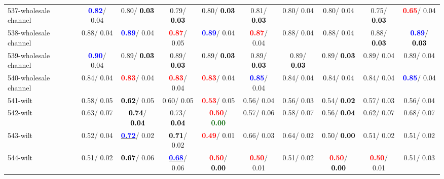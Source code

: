 \begin{table}[h]
\begin{center}
{\begin{tabular}{lc|c|c|c|c|c|c|c|c}
537-wholesale channel & \textcolor{blue}{\textbf{  0.82}}/  0.04 &   0.80/\textcolor{black}{\textbf{  0.03}} &   0.79/\textcolor{black}{\textbf{  0.03}} &   0.80/\textcolor{black}{\textbf{  0.03}} &   0.81/\textcolor{black}{\textbf{  0.03}} &   0.80/  0.04 &   0.80/  0.04 &   0.75/\textcolor{black}{\textbf{  0.03}} & \textcolor{red}{\textbf{  0.65}}/  0.04 \\
538-wholesale channel &   0.88/  0.04 & \textcolor{blue}{\textbf{  0.89}}/  0.04 & \textcolor{red}{\textbf{  0.87}}/  0.05 & \textcolor{blue}{\textbf{  0.89}}/  0.04 & \textcolor{red}{\textbf{  0.87}}/  0.04 &   0.88/  0.04 &   0.88/  0.04 &   0.88/\textcolor{black}{\textbf{  0.03}} & \textcolor{blue}{\textbf{  0.89}}/\textcolor{black}{\textbf{  0.03}} \\
539-wholesale channel & \textcolor{blue}{\textbf{  0.90}}/  0.04 &   0.89/\textcolor{black}{\textbf{  0.03}} &   0.89/\textcolor{black}{\textbf{  0.03}} &   0.89/\textcolor{black}{\textbf{  0.03}} &   0.89/\textcolor{black}{\textbf{  0.03}} &   0.89/\textcolor{black}{\textbf{  0.03}} &   0.89/\textcolor{black}{\textbf{  0.03}} &   0.89/  0.04 &   0.89/  0.04 \\
540-wholesale channel &   0.84/  0.04 & \textcolor{red}{\textbf{  0.83}}/  0.04 & \textcolor{red}{\textbf{  0.83}}/  0.04 & \textcolor{red}{\textbf{  0.83}}/  0.04 & \textcolor{blue}{\textbf{  0.85}}/  0.04 &   0.84/  0.04 &   0.84/  0.04 &   0.84/  0.04 & \textcolor{blue}{\textbf{  0.85}}/  0.04 \\ \hline
541-wilt &   0.58/  0.05 & \textcolor{black}{\textbf{  0.62}}/  0.05 &   0.60/  0.05 & \textcolor{red}{\textbf{  0.53}}/  0.05 &   0.56/  0.04 &   0.56/  0.03 &   0.54/\textcolor{black}{\textbf{  0.02}} &   0.57/  0.03 &   0.56/  0.04 \\
542-wilt &   0.63/  0.07 & \textcolor{black}{\textbf{  0.74}}/\textcolor{black}{\textbf{  0.04}} &   0.73/\textcolor{black}{\textbf{  0.04}} & \textcolor{red}{\textbf{  0.50}}/\textcolor{darkgreen}{\textbf{  0.00}} &   0.57/  0.06 &   0.58/  0.07 &   0.56/\textcolor{black}{\textbf{  0.04}} &   0.62/  0.07 &   0.68/  0.07 \\
543-wilt &   0.52/  0.04 & \underline{\textcolor{blue}{\textbf{  0.72}}}/  0.02 & \textcolor{black}{\textbf{  0.71}}/  0.02 & \textcolor{red}{\textbf{  0.49}}/  0.01 &   0.66/  0.03 &   0.64/  0.02 &   0.50/\textcolor{black}{\textbf{  0.00}} &   0.51/  0.02 &   0.51/  0.02 \\
544-wilt &   0.51/  0.02 & \textcolor{black}{\textbf{  0.67}}/  0.06 & \underline{\textcolor{blue}{\textbf{  0.68}}}/  0.06 & \textcolor{red}{\textbf{  0.50}}/\textcolor{black}{\textbf{  0.00}} & \textcolor{red}{\textbf{  0.50}}/  0.01 &   0.51/  0.02 & \textcolor{red}{\textbf{  0.50}}/\textcolor{black}{\textbf{  0.00}} & \textcolor{red}{\textbf{  0.50}}/  0.01 &   0.51/  0.03 \\\end{tabular}}\label{stratsALCKappa16Allallb}
\end{center}
\end{table}
